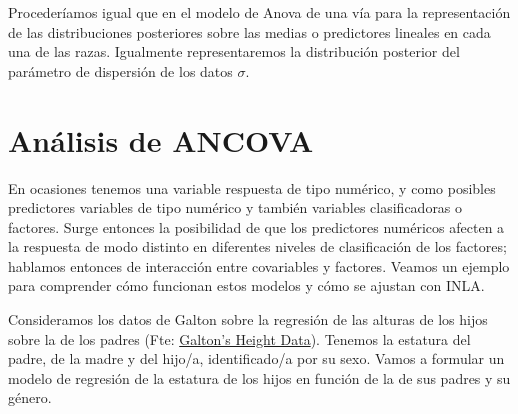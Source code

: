 \documentclass[
]{book}
\newenvironment{Shaded}{\begin{snugshade}}{\end{snugshade}}
\newcommand{\AttributeTok}[1]{\textcolor[rgb]{0.77,0.63,0.00}{#1}}
\newcommand{\CommentTok}[1]{\textcolor[rgb]{0.56,0.35,0.01}{\textit{#1}}}
\newcommand{\ConstantTok}[1]{\textcolor[rgb]{0.00,0.00,0.00}{#1}}
\newcommand{\FunctionTok}[1]{\textcolor[rgb]{0.00,0.00,0.00}{#1}}
\newcommand{\NormalTok}[1]{#1}
\newcommand{\OtherTok}[1]{\textcolor[rgb]{0.56,0.35,0.01}{#1}}
\newcommand{\StringTok}[1]{\textcolor[rgb]{0.31,0.60,0.02}{#1}}
\begin{document}
Procederíamos igual que en el modelo de Anova de una vía para la representación de las distribuciones posteriores sobre las medias o predictores lineales en cada una de las razas. Igualmente representaremos la distribución posterior del parámetro de dispersión de los datos \(\sigma\).

\hypertarget{anuxe1lisis-de-ancova}{%
\section{Análisis de ANCOVA}\label{anuxe1lisis-de-ancova}}

En ocasiones tenemos una variable respuesta de tipo numérico, y como posibles predictores variables de tipo numérico y también variables clasificadoras o factores. Surge entonces la posibilidad de que los predictores numéricos afecten a la respuesta de modo distinto en diferentes niveles de clasificación de los factores; hablamos entonces de interacción entre covariables y factores. Veamos un ejemplo para comprender cómo funcionan estos modelos y cómo se ajustan con INLA.

Consideramos los datos de Galton sobre la regresión de las alturas de los hijos sobre la de los padres (Fte: \href{http://www.randomservices.org/random/}{Galton's Height Data}). Tenemos la estatura del padre, de la madre y del hijo/a, identificado/a por su sexo.
Vamos a formular un modelo de regresión de la estatura de los hijos en función de la de sus padres y su género.

\begin{Shaded}
\end{Shaded}
\end{document}
